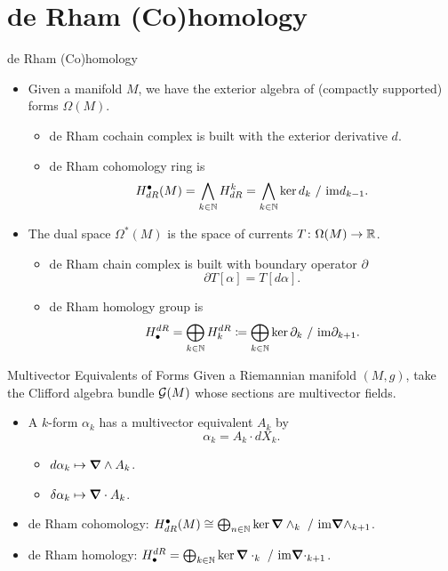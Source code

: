 \documentclass[UKenglish]{beamer}
\begin{document}
\section{de Rham (Co)homology}


\begin{frame}{de Rham (Co)homology}
\vfill
\begin{itemize}
    \item Given a manifold $M$, we have the exterior algebra of (compactly supported) forms $\Omega(M)$.
    \begin{itemize} 
        \item de Rham cochain complex is built with the exterior derivative $d$.
        \item de Rham cohomology ring is
        \[
            H^\bullet_{dR}(M) = \bigwedge_{k \in \mathbb{N}} H^k_{dR} = \bigwedge_{k \in \mathbb{N}} \ker d_k ~/~ \mathrm{im} d_{k-1}.
        \]
    \end{itemize}
    \item The dual space $\Omega^*(M)$ is the space of currents $T\colon \Omega(M) \to \mathbb{R}$.
    \begin{itemize}
        \item de Rham chain complex is built with boundary operator $\partial$
        \[
            \partial T[\alpha] = T[d \alpha].
        \]
        \item de Rham homology group is
        \[
            H_\bullet^{dR} = \bigoplus_{k\in \mathbb{N}} H_k^{dR} \coloneqq \bigoplus_{k\in \mathbb{N}} \ker \partial_k ~/~ \mathrm{im} \partial_{k+1}. 
        \]
    \end{itemize}
\end{itemize}
\vfill
\end{frame}

\begin{frame}{Multivector Equivalents of Forms}
\vfill
Given a Riemannian manifold $(M,g)$, take the Clifford algebra bundle $\mathcal{G}(M)$ whose sections are multivector fields.
\begin{itemize}
    \item A $k$-form $\alpha_k$ has a multivector equivalent $A_k$ by
    \[
    \alpha_k = A_k \cdot dX_k.
    \] 
    \begin{itemize}
        \item $d\alpha_k \mapsto \boldsymbol{\nabla} \wedge A_k$.
        \item $\delta \alpha_k \mapsto \boldsymbol{\nabla} \cdot A_k$.
    \end{itemize}
    \item de Rham cohomology: $H^\bullet_{dR}(M) \cong \bigoplus_{n\in \mathbb{N}} \ker \boldsymbol{\nabla} \wedge_k ~/~ \mathrm{im} \boldsymbol{\nabla} \wedge_{k+1}$.
    \item de Rham homology: $H_\bullet^{dR} = \bigoplus_{k\in \mathbb{N}} \ker \boldsymbol{\nabla}\cdot_k ~/~ \mathrm{im} \boldsymbol{\nabla}\cdot_{k+1}$. 
\end{itemize}
\vfill
\end{frame}
\end{document}
